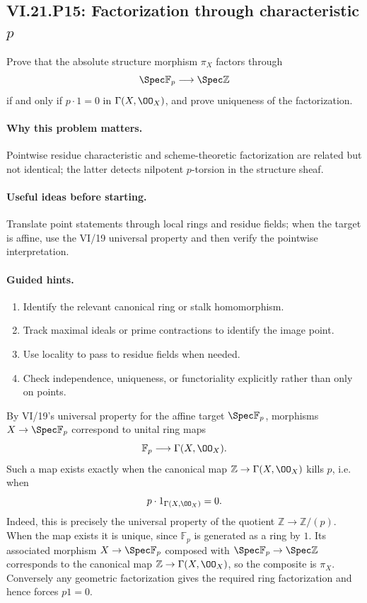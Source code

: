 \subsection*{VI.21.P15: Factorization through characteristic $p$}
\begin{problem}\label{prob:vi21-p15}
Prove that the absolute structure morphism $\pi_X$ factors through
\[
\Spec\mathbb F_p\longrightarrow\Spec\mathbb Z
\]
if and only if $p\cdot1=0$ in $\Gamma(X,\OO_X)$, and prove uniqueness of the factorization.
\end{problem}

\ifdefined\FullProblemDossiers
\paragraph{Why this problem matters.}
Pointwise residue characteristic and scheme-theoretic factorization are related but not identical; the latter detects nilpotent $p$-torsion in the structure sheaf.

\paragraph{Useful ideas before starting.}
Translate point statements through local rings and residue fields; when the target is affine, use the VI/19 universal property and then verify the pointwise interpretation.

\paragraph{Guided hints.}
\begin{enumerate}
\item Identify the relevant canonical ring or stalk homomorphism.
\item Track maximal ideals or prime contractions to identify the image point.
\item Use locality to pass to residue fields when needed.
\item Check independence, uniqueness, or functoriality explicitly rather than only on points.
\end{enumerate}

\begin{solution}
By VI/19's universal property for the affine target $\Spec\mathbb F_p$, morphisms
$X\to\Spec\mathbb F_p$ correspond to unital ring maps
\[
\mathbb F_p\longrightarrow\Gamma(X,\OO_X).
\]
Such a map exists exactly when the canonical map $\mathbb Z\to\Gamma(X,\OO_X)$ kills $p$, i.e.
when
\[
p\cdot1_{\Gamma(X,\OO_X)}=0.
\]
Indeed, this is precisely the universal property of the quotient $\mathbb Z\to\mathbb Z/(p)$.
When the map exists it is unique, since $\mathbb F_p$ is generated as a ring by $1$.  Its
associated morphism $X\to\Spec\mathbb F_p$ composed with
$\Spec\mathbb F_p\to\Spec\mathbb Z$ corresponds to the canonical map
$\mathbb Z\to\Gamma(X,\OO_X)$, so the composite is $\pi_X$.  Conversely any geometric
factorization gives the required ring factorization and hence forces $p1=0$.
\end{solution}

